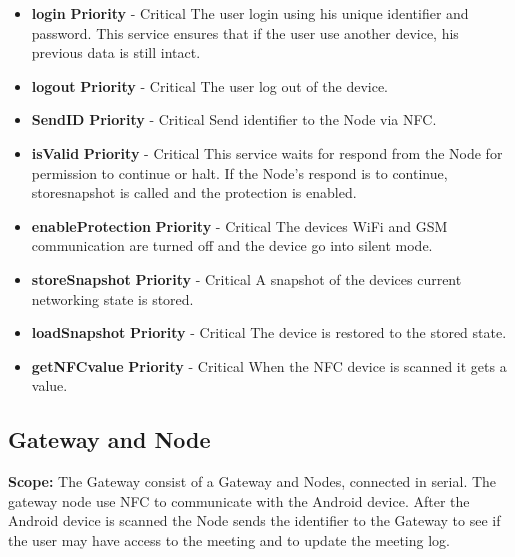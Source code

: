 \documentclass[a4paper,12pt,titlepage]{article}
\begin{document}
		\begin{itemize}
			\item \textbf{login}
				\newline\textbf{ Priority } - Critical
				\newline The user login using his unique identifier and password. This service ensures that if the user use another device, his previous data is still intact.
			\item \textbf{logout}
				\newline\textbf{ Priority } - Critical
				\newline The user log out of the device.
			\item \textbf{SendID}
				\newline\textbf{ Priority } - Critical
				\newline Send identifier to the Node via NFC.
			\item \textbf{isValid}
				\newline\textbf{ Priority } - Critical
				\newline This service waits for respond from the Node for permission to  continue or halt. If the Node’s respond is to continue, storesnapshot is called and the protection is enabled.
			\item \textbf{enableProtection}
				\newline\textbf{ Priority } - Critical
				\newline The devices WiFi and GSM communication are turned off and the device go into silent mode.
			\item \textbf{storeSnapshot}
				\newline\textbf{ Priority } - Critical
				\newline A snapshot of the devices current networking state is stored.

			\item \textbf{loadSnapshot}
				\newline\textbf{ Priority } - Critical
				\newline The device is restored to the stored state.

			\item \textbf{getNFCvalue}
				\newline\textbf{ Priority } - Critical
				\newline When the NFC device is scanned it gets a value.


		\end{itemize}

\newpage		
		\subsection{Gateway and Node}
\textbf{Scope: }The Gateway consist of a Gateway and Nodes, connected in serial. The gateway node use NFC to communicate with the Android device. After the Android device is scanned the Node sends the identifier to the Gateway to see if the user may have access to the meeting and to update the meeting log. 
\end{document}
